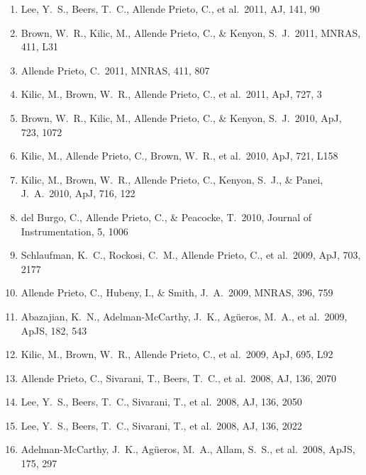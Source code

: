 \documentclass[12pt]{article}
\begin{document}
\begin{enumerate}
\item Lee, Y.~S., Beers, T.~C., 
Allende Prieto, C., et al.\ 2011, AJ, 141, 90 


\item Brown, W.~R., Kilic, M., 
Allende Prieto, C., \& Kenyon, S.~J.\ 2011, MNRAS, 411, L31 


\item Allende Prieto, C.\ 
2011, MNRAS, 411, 807 


\item Kilic, M., Brown, W.~R., 
Allende Prieto, C., et al.\ 2011, ApJ, 727, 3 


\item Brown, W.~R., Kilic, M., 
Allende Prieto, C., \& Kenyon, S.~J.\ 2010, ApJ, 723, 1072 


\item Kilic, M., Allende 
Prieto, C., Brown, W.~R., et al.\ 2010, ApJ, 721, L158 


\item Kilic, M., Brown, W.~R., 
Allende Prieto, C., Kenyon, S.~J., \& Panei, J.~A.\ 2010, ApJ, 716, 122 


\item del Burgo, C., 
Allende Prieto, C., 
\& Peacocke, T.\ 2010, Journal of Instrumentation, 5, 1006 


\item Schlaufman, K.~C., 
Rockosi, C.~M., Allende Prieto, C., et al.\ 2009, ApJ, 703, 2177 


\item Allende Prieto, 
C., Hubeny, I., \& Smith, J.~A.\ 2009, MNRAS, 396, 759 


\item Abazajian, K.~N., 
Adelman-McCarthy, J.~K., Ag{\"u}eros, M.~A., et al.\ 2009, ApJS, 182, 543 


\item Kilic, M., Brown, W.~R., 
Allende Prieto, C., et al.\ 2009, ApJ, 695, L92 


\item Allende Prieto, 
C., Sivarani, T., Beers, T.~C., et al.\ 2008, AJ, 136, 2070 


\item Lee, Y.~S., Beers, T.~C., 
Sivarani, T., et al.\ 2008, AJ, 136, 2050 


\item Lee, Y.~S., Beers, T.~C., 
Sivarani, T., et al.\ 2008, AJ, 136, 2022 


\item 
Adelman-McCarthy, J.~K., Ag{\"u}eros, M.~A., Allam, S.~S., et al.\ 2008, 
ApJS, 175, 297 



\end{enumerate}
\end{document}

